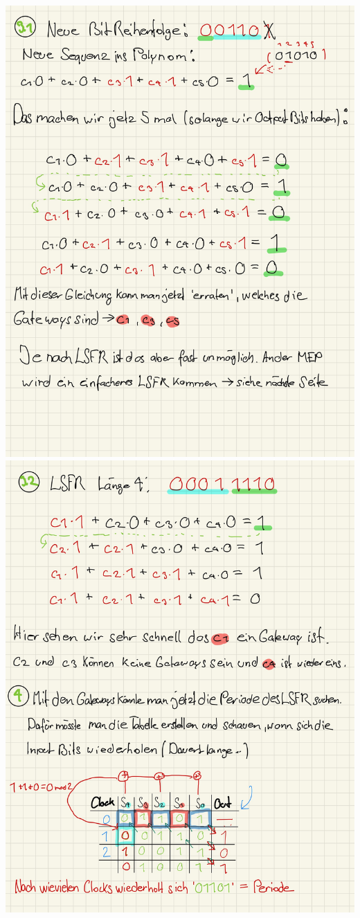 \documentclass[11pt]{article}
\begin{document}
\begin{center}
	\includegraphics[scale=0.96]{img/lsfr2_2.jpg}\\
	
	\includegraphics[scale=0.96]{img/lsfr2_3.jpg}\\
	

\end{center}
\end{document}

